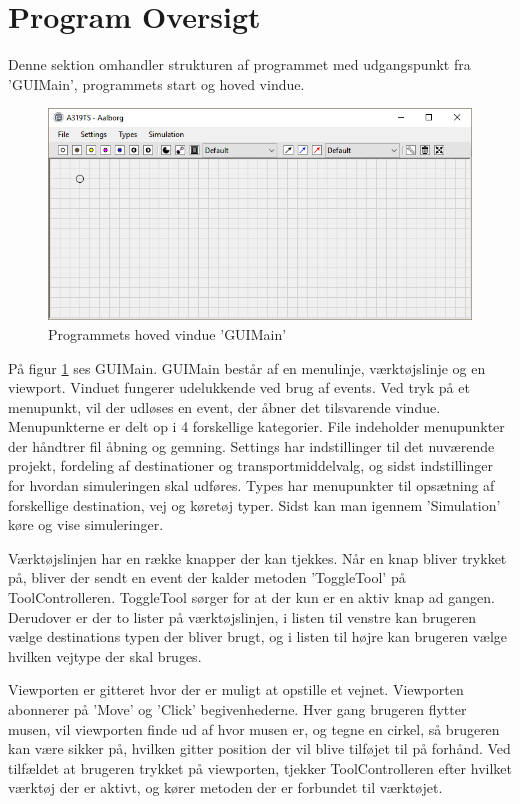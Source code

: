 \section{Program Oversigt}
Denne sektion omhandler strukturen af programmet med udgangspunkt fra 'GUIMain', programmets start og hoved vindue. 

\begin{figure}[!h]
    \centering
    \includegraphics[width=\textwidth,height=\textheight,keepaspectratio]{Pictures/Implementation/program}
    \caption{Programmets hoved vindue 'GUIMain'}
    \label{a319program}
\end{figure}

På figur \ref{a319program} ses GUIMain. GUIMain består af en menulinje, værktøjslinje og en viewport. Vinduet fungerer udelukkende ved brug af events. Ved tryk på et menupunkt, vil der udløses en event, der åbner det tilsvarende vindue. Menupunkterne er delt op i 4 forskellige kategorier. File indeholder menupunkter der håndtrer fil åbning og gemning. Settings har indstillinger til det nuværende projekt, fordeling af destinationer og transportmiddelvalg, og sidst indstillinger for hvordan simuleringen skal udføres. Types har menupunkter til opsætning af forskellige destination, vej og køretøj typer. Sidst kan man igennem 'Simulation' køre og vise simuleringer.

\vspace{5mm}

Værktøjslinjen har en række knapper der kan tjekkes. Når en knap bliver trykket på, bliver der sendt en event der kalder metoden 'ToggleTool' på ToolControlleren. ToggleTool sørger for at der kun er en aktiv knap ad gangen. Derudover er der to lister på værktøjslinjen, i listen til venstre kan brugeren vælge destinations typen der bliver brugt, og i listen til højre kan brugeren vælge hvilken vejtype der skal bruges.

\vspace{5mm}

Viewporten er gitteret hvor der er muligt at opstille et vejnet. Viewporten abonnerer på 'Move' og 'Click' begivenhederne. Hver gang brugeren flytter musen, vil viewporten finde ud af hvor musen er, og tegne en cirkel, så brugeren kan være sikker på, hvilken gitter position der vil blive tilføjet til på forhånd. Ved tilfældet at brugeren trykket på viewporten, tjekker ToolControlleren efter hvilket værktøj der er aktivt, og kører metoden der er forbundet til værktøjet.